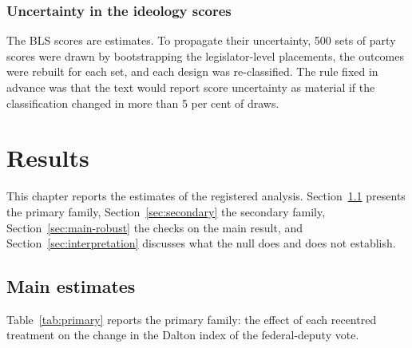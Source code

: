 \documentclass[
	11pt,				%
	oneside,			%
	a4paper,			%
	english,			%
	english				%
	]{abntex2ppgsi}
\theoremstyle{plain}
\theoremstyle{remark}
\theoremstyle{plain}%
\theoremstyle{remark}%
\begin{document}
\subsection{Uncertainty in the ideology scores}

The BLS scores are estimates. To propagate their uncertainty, 500 sets of party scores were drawn by bootstrapping the legislator-level placements, the outcomes were rebuilt for each set, and each design was re-classified. The rule fixed in advance was that the text would report score uncertainty as material if the classification changed in more than 5 per cent of draws.
\chapter{Results}
\label{ch:results}

This chapter reports the estimates of the registered analysis. Section~\ref{sec:main-results} presents the primary family, Section~\ref{sec:secondary} the secondary family, Section~\ref{sec:main-robust} the checks on the main result, and Section~\ref{sec:interpretation} discusses what the null does and does not establish.

\section{Main estimates}
\label{sec:main-results}

Table~\ref{tab:primary} reports the primary family: the effect of each recentred treatment on the change in the Dalton index of the federal-deputy vote.
\end{document}
